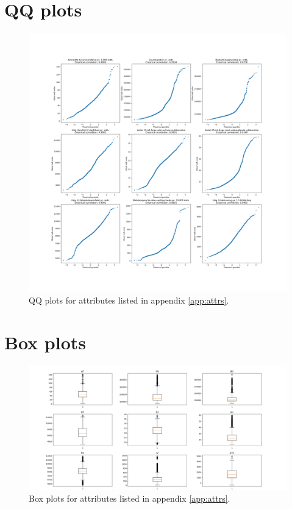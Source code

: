 \documentclass[11pt,fleqn]{article}
\numberwithin{footnote}{section}
\numberwithin{figure}{section}
\numberwithin{table}{section}
\begin{document}
\section{QQ plots}
\begin{figure}[H]
	\centering
	\includegraphics[width=\textwidth]{qq-plots}
	\caption{QQ plots for attributes listed in appendix \ref{app:attrs}.}\label{fig:qq}
\end{figure}
\section{Box plots}
\begin{figure}[H]
	\centering
	\includegraphics[width=\textwidth]{boxplot_statistics}
	\caption{Box plots for attributes listed in appendix \ref{app:attrs}.}\label{fig:bp}
\end{figure}
\end{document}
